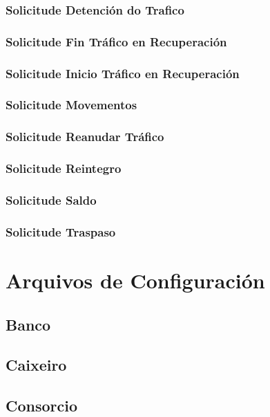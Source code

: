 \documentclass[a4paper,titlepage]{article}
\begin{document}
\subsubsection{Solicitude Detención do Trafico}

\subsubsection{Solicitude Fin Tráfico en Recuperación}

\subsubsection{Solicitude Inicio Tráfico en Recuperación}

\subsubsection{Solicitude Movementos}

\subsubsection{Solicitude Reanudar Tráfico}

\subsubsection{Solicitude Reintegro}

\subsubsection{Solicitude Saldo}

\subsubsection{Solicitude Traspaso}


\clearpage
\newpage

\section{Arquivos de Configuración}
\subsection{Banco}


\subsection{Caixeiro}


\subsection{Consorcio}

\end{document}
